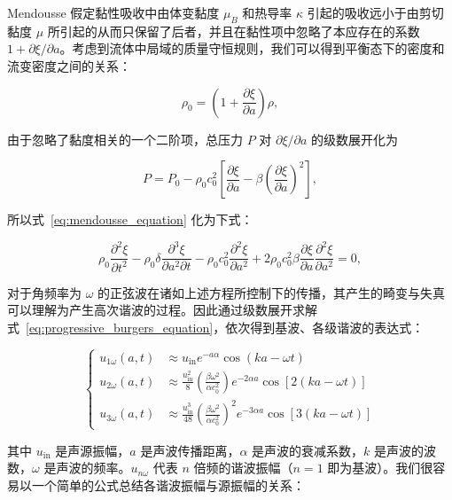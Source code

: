 Mendousse 假定黏性吸收中由体变黏度 $\mu_{B}$ 和热导率 $\kappa$ 引起的吸收远小于由剪切黏度 $\mu$ 所引起的从而只保留了后者，并且在黏性项中忽略了本应存在的系数 $1+\partial\xi/\partial a$。考虑到流体中局域的质量守恒规则，我们可以得到平衡态下的密度和流变密度之间的关系：

\begin{equation}
  \rho_{0} = \left(1 + \frac{\partial\xi}{\partial a}\right)\rho,
\end{equation}

由于忽略了黏度相关的一个二阶项，总压力 $P$ 对 $\partial\xi/\partial a$ 的级数展开化为

\begin{equation}
  P = P_{0} - \rho_{0}c_{0}^{2}\left[\frac{\partial\xi}{\partial a} - \beta\left(\frac{\partial\xi}{\partial a}\right)^{2}\right],
\end{equation}

所以式~\eqref{eq:mendousse_equation} 化为下式：

\begin{equation}
  \rho_{0}\frac{\partial^{2}\xi}{\partial t^{2}} - \rho_{0}\delta\frac{\partial^{3}\xi}{\partial a^{2}\partial t} - \rho_{0}c_{0}^{2}\frac{\partial^{2}\xi}{\partial a^{2}} + 2\rho_{0}c_{0}^{2}\beta\frac{\partial\xi}{\partial a}\frac{\partial^{2}\xi}{\partial a^{2}} = 0,\label{eq:progressive_burgers_equation}
\end{equation}

对于角频率为 $\omega$ 的正弦波在诸如上述方程所控制下的传播，其产生的畸变与失真可以理解为产生高次谐波的过程。因此通过级数展开求解式~\eqref{eq:progressive_burgers_equation}，依次得到基波、各级谐波的表达式：

\begin{equation}
  \begin{cases}
    u_{1\omega}(a,t) &\approx u_{\text{in}}e^{-a\alpha}\cos{(ka-\omega t)}\\
    u_{2\omega}(a,t) &\approx \frac{u_{\text{in}}^{2}}{8}\left(\frac{\beta\omega^{2}}{\alpha c_{0}^{2}}\right)e^{-2\alpha a}\cos{[2(ka-\omega t)]}\\
    u_{3\omega}(a,t) &\approx \frac{u_{\text{in}}^{3}}{48}\left(\frac{\beta\omega^{2}}{\alpha c_{0}^{2}}\right)^{2}e^{-3\alpha a}\cos{[3(ka-\omega t)]}
    \end{cases}
\end{equation}

其中 $u_{\text{in}}$ 是声源振幅，$a$ 是声波传播距离，$\alpha$ 是声波的衰减系数，$k$ 是声波的波数，$\omega$ 是声波的频率。$u_{n\omega}$ 代表 $n$ 倍频的谐波振幅（$n=1$ 即为基波）。我们很容易以一个简单的公式总结各谐波振幅与源振幅的关系：

